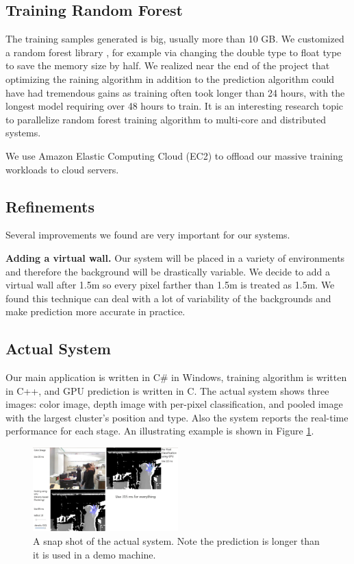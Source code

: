 \cutsection
\subsection{Training Random Forest}
\cutsection

The training samples generated is big, usually more than 10 GB. We customized a random forest library \cite{alglib}, for example via changing the double type to float type to save the memory size by half. We realized near the end of the project that optimizing the raining algorithm in addition to the prediction algorithm could have had tremendous gains as training often took longer than 24 hours, with the longest model requiring over 48 hours to train. It is an interesting research topic to parallelize random forest training algorithm to multi-core and distributed systems.     

We use Amazon Elastic Computing Cloud (EC2) to offload our massive training workloads to cloud servers.  

\cutsection
\subsection{Refinements}
\cutsection
\label{sec:refinement}

Several improvements we found are very important for our systems.

\textbf{Adding a virtual wall.} Our system will be placed in a variety of environments and therefore the background will be drastically variable. We decide to add a virtual wall after 1.5m so every pixel farther than 1.5m is treated as 1.5m. We found this technique can deal with a lot of variability of the backgrounds and make prediction more accurate in practice. 

\cutsection
\subsection{Actual System}
\cutsection

Our main application is written in C\# in Windows, training algorithm is written in C++, and GPU prediction is written in C. The actual system shows three images: color image, depth image with per-pixel classification, and pooled image with the largest cluster's position and type. Also the system reports the real-time performance for each stage. An illustrating example is shown in Figure \ref{fig: system}.


\begin{figure}
\centering
	\includegraphics[width=0.5\textwidth]{fig/System.jpg}
		\cutcaption
	\caption{A snap shot of the actual system. Note the prediction is longer than it is used in a demo machine.}
\label{fig: system}
\end{figure}

